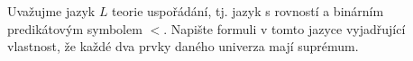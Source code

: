 Uvažujme jazyk $L$ teorie uspořádání, tj. jazyk s rovností a binárním
predikátovým symbolem $<$. Napište formuli v tomto jazyce vyjadřující vlastnost,
že každé dva prvky daného univerza mají suprémum.
